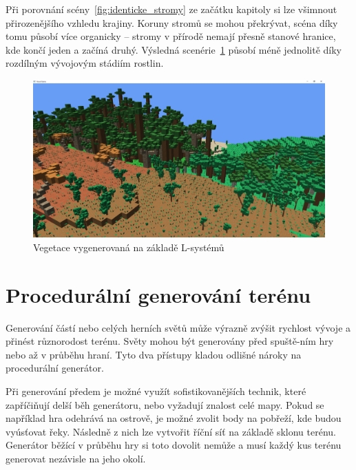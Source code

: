 \documentclass[thesis=M,czech]{FITthesis}[2019/12/23]
\begin{document}
Při porovnání scény~\ref{fig:identicke_stromy} ze začátku kapitoly si lze všimnout přirozenějšího vzhledu krajiny. Koruny stromů se mohou překrývat, scéna díky tomu působí více organicky -- stromy v přírodě nemají přesně stanové hranice, kde končí jeden a začíná druhý. Výsledná scenérie~\ref{fig:new_vegetation} působí méně jednolitě díky rozdílným vývojovým stádiím rostlin.

\begin{figure}\centering
	\includegraphics[width=\textwidth]{images/new_vegetation}
	\caption[Vegetace vygenerovaná na základě L-systémů]{Vegetace vygenerovaná na základě L-systémů}\label{fig:new_vegetation}
\end{figure}


\chapter{Procedurální generování terénu}

Generování částí nebo celých herních světů může výrazně zvýšit rychlost vývoje a přinést různorodost terénu. Světy mohou být generovány před spuště-ním hry nebo až v průběhu hraní. Tyto dva přístupy kladou odlišné nároky na procedurální generátor.

Při generování předem je možné využít sofistikovanějších technik, které zapříčiňují delší běh generátoru, nebo vyžadují znalost celé mapy. Pokud se například hra odehrává na ostrově, je možné zvolit body na pobřeží, kde budou vyúsťovat řeky. Následně z nich lze vytvořit říční síť na základě sklonu terénu. Generátor běžící v průběhu hry si toto dovolit nemůže a musí každý kus terénu generovat nezávisle na jeho okolí.
\end{document}
